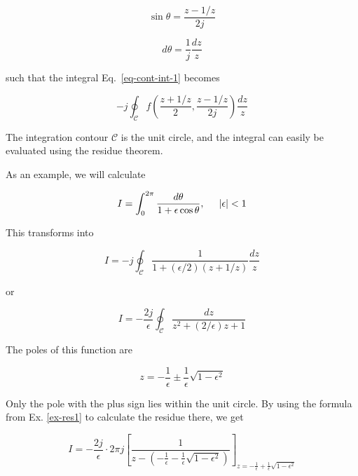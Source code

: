 \begin{equation}
\sin \theta = \frac{z - 1/z}{2j}
\end{equation} 

\begin{equation}
d \theta = \frac{1}{j}\frac{dz}{z}
\end{equation} 

such that the integral Eq.~\ref{eq-cont-int-1} becomes

\begin{equation}
-j \oint_{\mathcal{C}} f\left(\frac{z + 1/z}{2}, \frac{z - 1/z}{2j}\right)
\frac{dz}{z}
\end{equation} 

The integration contour $\mathcal{C}$ is the unit circle, and the integral can
easily be evaluated using the residue theorem.

As an example, we will calculate

\begin{equation}
I = \int_0^{2 \pi} \frac{d \theta}{1 + \epsilon \cos \theta}, \hspace{0.5cm}
|\epsilon| < 1
\end{equation} 

This transforms into

\begin{equation}
I = -j \oint_{\mathcal{C}} \frac{1}{1 + (\epsilon / 2)\left(z + 1/z\right)}
\frac{dz}{z}
\end{equation} 

or

\begin{equation}
I = -\frac{2j}{\epsilon} \oint_{\mathcal{C}} \frac{dz}{z^2 + (2 / \epsilon)z +
1}
\end{equation} 

The poles of this function are

\begin{equation}
z = - \frac{1}{\epsilon} \pm \frac{1}{\epsilon} \sqrt{1 - \epsilon^2}
\end{equation} 

Only the pole with the plus sign lies within the unit circle. By using the
formula from Ex. \ref{ex-res1} to calculate the residue there, we get

\begin{equation}
I = -\frac{2j}{\epsilon} \cdot 2 \pi j \left[\frac{1}{z - (-\frac{1}{\epsilon} -
\frac{1}{\epsilon} \sqrt{1 - \epsilon^2})}\right]_{z = - \frac{1}{\epsilon} +
\frac{1}{\epsilon} \sqrt{1 - \epsilon^2}}
\end{equation}

